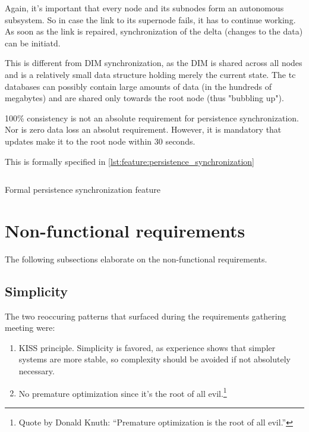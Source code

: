 Again, it's important that every node and its subnodes form an autonomous subsystem. So
in case the link to its supernode fails, it has to continue working. As soon as
the link is repaired, synchronization of the delta (changes to the data) can
be initiatd.

This is different from \gls{DIM} synchronization, as the DIM is shared across
all nodes and is a relatively small data structure holding merely the current state. The \gls{tc} databases
can possibly contain large amounts of data (in the hundreds of megabytes) and
are shared only towards the root node (thus "bubbling up").

100\% consistency is not an absolute requirement for persistence synchronization.
Nor is zero data loss an absolut requirement. However, it is mandatory that
updates make it to the root node within 30 seconds.

This is formally specified in \autoref{lst:feature:persistence_synchronization}

\begin{listing}
	\inputminted{Gherkin}{listings/features/persistence_synchronization.feature}
	\caption{Formal persistence synchronization feature}
	\label{lst:feature:persistence_synchronization}
\end{listing}

\section{Non-functional requirements}\label{sec:nfr}
The following subsections elaborate on the non-functional requirements.

\subsection{Simplicity}
The two reoccuring patterns that surfaced during the requirements gathering
meeting were:

\begin{enumerate}
\item \gls{KISS} principle. Simplicity is favored, as experience shows that
	simpler systems are more stable, so complexity should be avoided if not
	absolutely necessary.

\item No premature optimization since it's the root of all evil.\footnote{Quote
	by Donald Knuth: ``Premature optimization is the root of all evil.''}
\end{enumerate}


